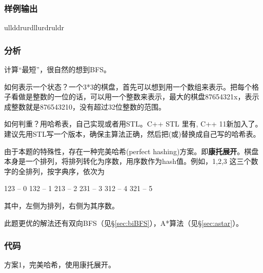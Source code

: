 \subsubsection{样例输出}
\begin{Code}
ullddrurdllurdruldr
\end{Code}

\subsubsection{分析}
计算“最短”，很自然的想到BFS。

如何表示一个状态？一个3*3的棋盘，首先可以想到用一个数组来表示。把每个格子看做是整数的一位的话，可以用一个整数来表示，最大的棋盘87654321x，表示成整数就是876543210，没有超过32位整数的范围。

如何判重？用哈希表，自己实现或者用STL。C++ STL 里有, C++ 11新加入了。建议先用STL写一个版本，确保主算法正确，然后把(或)替换成自己写的哈希表。

由于本题的特殊性，存在一种完美哈希(perfect hashing)方案。即\textbf{康托展开}。棋盘本身是一个排列，将排列转化为序数，用序数作为hash值。例如，1,2,3 这三个数字的全排列，按字典序，依次为
\begin{Code}
123 -- 0
132 -- 1
213 -- 2
231 -- 3
312 -- 4
321 -- 5
\end{Code}
其中，左侧为排列，右侧为其序数。

此题更优的解法还有双向BFS（见\S \ref{sec:biBFS}），A*算法（见\S \ref{sec:astar}）。

\subsubsection{代码}

方案1，完美哈希，使用康托展开。

